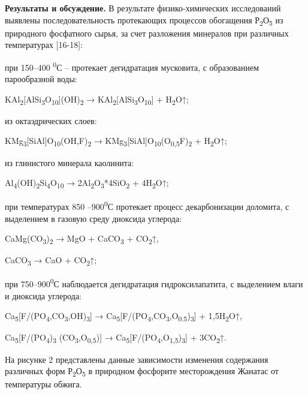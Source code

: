 \begin{multicols}{2}
{\bfseries Результаты и обсуждение.} В результате физико-химических
исследований выявлены последовательность протекающих процессов
обогащения Р\textsubscript{2}О\textsubscript{5} из природного фосфатного
сырья, за счет разложения минералов при различных температурах
{[}16-18{]}:

при 150--400 \textsuperscript{0}С -- протекает дегидратация мусковита, с
образованием парообразной воды:

KAl\textsubscript{2}{[}AlSi\textsubscript{3}O\textsubscript{10}{]}(OH)\textsubscript{2}
→ KAl\textsubscript{2}{[}AlSi\textsubscript{3}O\textsubscript{10}{]} +
H\textsubscript{2}O↑;

из октаэдрических слоев:

KMg\textsubscript{3}{[}SiAl{]}O\textsubscript{10}(OH,F)\textsubscript{2}
→
KMg\textsubscript{3}{[}SiAl{]}O\textsubscript{10}(O\textsubscript{0,5}F)\textsubscript{2}
+ H\textsubscript{2}O↑;

из глинистого минерала каолинита:

Al\textsubscript{4}(OH)\textsubscript{2}Si\textsubscript{4}O\textsubscript{10}
→ 2Al\textsubscript{2}O\textsubscript{3}*4SiO\textsubscript{2} +
4H\textsubscript{2}O↑;

при температурах 850 --900\textsuperscript{0}С протекает процесс
декарбонизации доломита, с выделением в газовую среду диоксида углерода:

CaMg(CO\textsubscript{3})\textsubscript{2} → MgO + CaCO\textsubscript{3}
+ CO\textsubscript{2}↑,

CaCO\textsubscript{3} → CaO + CO\textsubscript{2}↑;

при 750--900\textsuperscript{0}С наблюдается дегидратация
гидроксилапатита, с выделением влаги и диоксида углерода:

Ca\textsubscript{5}{[}F/(PO\textsubscript{4},CO\textsubscript{3},OH)\textsubscript{3}{]}
→
Ca\textsubscript{5}{[}F/(PO\textsubscript{4},CO\textsubscript{3},O\textsubscript{0.5})\textsubscript{3}{]}
+ 1,5H\textsubscript{2}O↑,

Ca\textsubscript{5}{[}F/(PO\textsubscript{4})\textsubscript{3}
(CO\textsubscript{3},O\textsubscript{0,5}){]} →
Ca\textsubscript{5}{[}F/(PO\textsubscript{4},O\textsubscript{1,5})\textsubscript{3}{]}
+ 3CO\textsubscript{2}↑.

На рисунке 2 представлены данные зависимости изменения содержания
различных форм Р\textsubscript{2}О\textsubscript{5} в природном
фосфорите месторождения Жанатас от температуры обжига.
\end{multicols}

